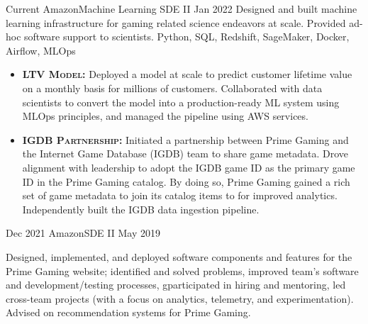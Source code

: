 \documentclass{cv}
\begin{document}
	\begin{experiences_env}
		\experienceWithProjects
			{Current}       {Amazon}{Machine Learning SDE II}
			{Jan 2022}      {
								Designed and built machine learning infrastructure for gaming related science endeavors at scale. Provided ad-hoc software support to scientists.
							}
							{Python, SQL, Redshift, SageMaker, Docker, Airflow, MLOps}
							{
								\begin{itemize}
									\item \textbf{\textsc{LTV Model:}} Deployed a model at scale to predict customer lifetime value on a monthly basis for millions of customers. Collaborated with data scientists to convert the model into a production-ready ML system using MLOps principles, and managed the pipeline using AWS services.
									\item \textbf{\textsc{IGDB Partnership:}} Initiated a partnership between Prime Gaming and the Internet Game Database (IGDB) team to share game metadata. Drove alignment with leadership to adopt the IGDB game ID as the primary game ID in the Prime Gaming catalog. By doing so, Prime Gaming gained a rich set of game metadata to join its catalog items to for improved analytics. Independently built the IGDB data ingestion pipeline.
								\end{itemize}
							}
		\emptySeparator
		\experienceWithProjects
			{Dec 2021}      {Amazon}{SDE II}
			{May 2019}      {
								Designed, implemented, and deployed software components and features for the Prime Gaming website; identified and solved problems, improved team’s software and development/testing processes, gparticipated in hiring and mentoring, led cross-team projects (with a focus on analytics, telemetry, and experimentation). Advised on recommendation systems for Prime Gaming.
								
}
\end{experiences_env}
\end{document}
